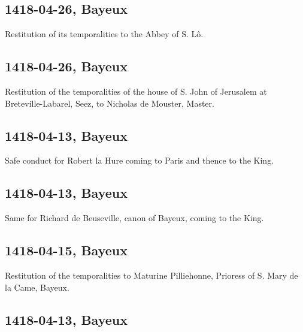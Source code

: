 \documentclass[a4paper,12pt,twoside]{book}
\begin{document}
                \subsection{1418-04-26, Bayeux}
                
                
                     Restitution of its temporalities to the Abbey of S. Lô.
                  
                
                \subsection{1418-04-26, Bayeux}
                
                
                     Restitution of the temporalities of the house of S. John of Jerusalem at Breteville-Labarel, Seez, to Nicholas de Mouster, Master.
                  
                
                \subsection{1418-04-13, Bayeux}
                
                
                     Safe conduct for Robert la Hure coming to Paris and thence to the King.
                  
                
                \subsection{1418-04-13, Bayeux}
                
                
                     Same for Richard de Beuseville, canon of Bayeux, coming to the King.
                  
                
                \subsection{1418-04-15, Bayeux}
                
                
                     Restitution of the temporalities to Maturine Pilliehonne, Prioress of S. Mary de la Came, Bayeux.
                  
                
                \subsection{1418-04-13, Bayeux}
                
\end{document}
